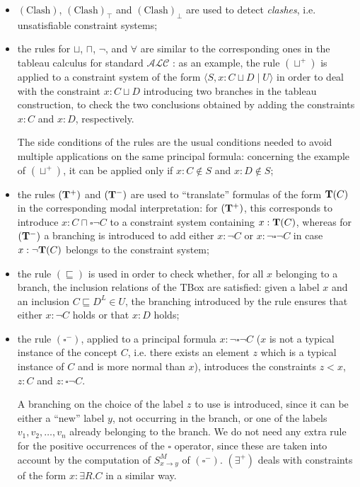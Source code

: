 \documentclass[a4paper, 11pt, oneside]{duthesis}
\newcommand{\tip}{{\bf T}}
\newcommand{\alc}{\mathcal{ALC}}
\newcommand{\nott} {\lnot}
\newcommand{\tc} {\mid}
\newcommand{\imp} {\rightarrow}
\newcommand{\bbox}{\square}
\newcommand{\sx} {\langle}
\newcommand{\dx} {\rangle}
\newcommand{\esiste} {\exists}
\newcommand{\Gammam}[2]{S^{M}_{#1 \imp #2}}
\begin{document}
\begin{itemize}
  \item $(\mbox{Clash})$, $(\mbox{Clash})_\top$ and $(\mbox{Clash})_\bot$ are used to detect \emph{clashes}, i.e. unsatisfiable constraint systems;
  
  \item the rules for $\sqcup$, $\sqcap$, $\nott$, and $\forall$ are similar to the corresponding ones in the tableau calculus for standard $\alc$ \cite{buchheit-et-al}: as an example, the rule $(\sqcup^+)$ is applied to a constraint system of the form $\sx S, x: C \sqcup D \tc U \dx$ in order to deal with the constraint $x: C \sqcup D$ introducing two branches in the tableau construction, to check the two conclusions obtained by adding the constraints $x: C$ and $x: D$, respectively. 
  
  The side conditions of the rules are the usual conditions needed to avoid multiple applications on the same principal formula: concerning the example of $(\sqcup^+)$, it can be applied only if $x: C \not \in S$ and $x: D \not\in S$;
  
  \item the rules $(\tip^+)$ and $(\tip^-)$ are used to ``translate'' formulas of the form $\tip(C)$ in the corresponding modal interpretation: for $(\tip^+)$, this corresponds to introduce $x: C \sqcap \bbox \nott C$ to a constraint system containing $x: \tip(C)$, whereas for $(\tip^-)$ a branching is introduced to add either $x: \nott C$ or $x: \nott \bbox \nott C$ in case $x: \nott \tip(C)$ belongs to the constraint system;
  
  \item the rule $(\sqsubseteq)$ is used in order to check whether, for all $x$ belonging to a branch, the inclusion relations of the TBox are satisfied: given a label $x$ and an inclusion $C \sqsubseteq D^L \in U$, the branching introduced by the rule ensures that either $x: \nott C$ holds or that $x: D$ holds;
  
  \item the rule $(\bbox^-)$, applied to a principal formula $x: \nott \bbox \nott C$ ($x$ is not a typical instance of the concept $C$, i.e. there exists an element $z$ which is a typical instance of $C$ and is more normal than $x$), introduces the constraints $z < x$, $z: C$ and $z: \bbox \nott C$.
  
A branching on the choice of the label $z$ to use is introduced, since it can be either a ``new'' label $y$, not occurring in the branch, or one of the labels $v_1, v_2, \dots, v_n$ already belonging to the branch.
We do not need any extra rule for the positive occurrences of the $\bbox$ operator, since these are taken into account by the computation of $\Gammam{x}{y}$ of $(\bbox^-)$. $(\esiste^{+})$ deals with constraints of the form $x: \esiste R.C$ in a similar way.


\end{itemize}
\end{document}

